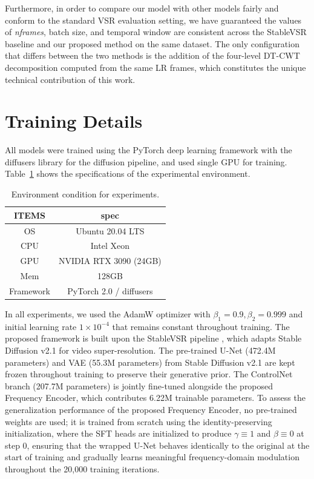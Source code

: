Furthermore, in order to compare our model with other models 
fairly and conform to the standard VSR evaluation setting, we 
have guaranteed the values of \textit{nframes}, batch size, and 
temporal window are consistent across the StableVSR baseline 
and our proposed method on the same dataset. The only 
configuration that differs between the two methods is the 
addition of the four-level DT-CWT decomposition computed from 
the same LR frames, which constitutes the unique technical 
contribution of this work.


\section{Training Details}
\label{sec:training_details}

All models were trained using the PyTorch deep learning 
framework with the diffusers library 
\cite{vonplaten2022diffusers} for the diffusion pipeline, and 
used single GPU for training. Table~\ref{tab:environment} shows 
the specifications of the experimental environment.

\begin{table}[htbp]
\caption{Environment condition for experiments.}
\centering
\begin{tabular}{c|c}
\hline
ITEMS & spec \\
\hline\hline
OS      & Ubuntu 20.04 LTS \\
CPU     & Intel Xeon \\
GPU     & NVIDIA RTX 3090 (24GB) \\
Mem     & 128GB \\
Framework & PyTorch 2.0 / diffusers \\
\hline
\end{tabular}
\label{tab:environment}
\end{table}

In all experiments, we used the AdamW optimizer 
\cite{kingma2014adam} with $\beta_1=0.9, \beta_2=0.999$ and 
initial learning rate $1 \times 10^{-4}$ that remains constant 
throughout training. The proposed framework is built upon the 
StableVSR pipeline \cite{rota2024stablevsr}, which adapts 
Stable Diffusion v2.1 \cite{rombach2022ldm} for video 
super-resolution. The pre-trained U-Net (472.4M parameters) 
and VAE (55.3M parameters) from Stable Diffusion v2.1 are kept 
frozen throughout training to preserve their generative prior. 
The ControlNet branch (207.7M parameters) is jointly fine-tuned 
alongside the proposed Frequency Encoder, which contributes 
6.22M trainable parameters. To assess the generalization 
performance of the proposed Frequency Encoder, no pre-trained 
weights are used; it is trained from scratch using the 
identity-preserving initialization, where the SFT heads are 
initialized to produce $\gamma \equiv 1$ and $\beta \equiv 0$ 
at step 0, ensuring that the wrapped U-Net behaves identically 
to the original at the start of training and gradually learns 
meaningful frequency-domain modulation throughout the 20{,}000 
training iterations.

